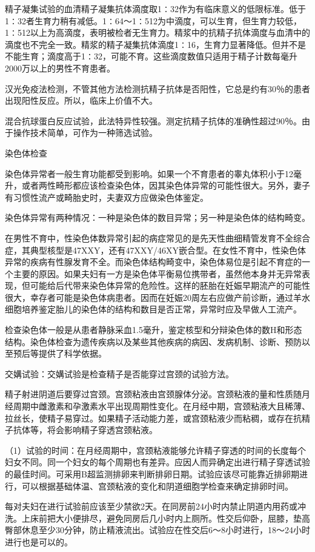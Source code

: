 \documentclass[12pt,UTF8,openany]{ctexbook}
\begin{document}
精子凝集试验的血清精子凝集抗体滴度取1∶32作为有临床意义的低限标准。低于1∶32者生育力稍有减低。1∶64～1∶512为中滴度，可以生育，但生育力较低，1∶512以上为高滴度，表明被检者无生育力。精浆中的抗精子抗体滴度与血清中的滴度也不完全一致。精浆的精子凝集抗体滴度1∶16，生育力显著降低。但并不是不能生育；滴度高于1∶32，可能不育。这些滴度数值只适用于精子计数每毫升2000万以上的男性不育患者。

汉光免疫法检测，不管其他方法检测抗精子抗体是否阳性，它总是约有30％的患者出现阳性反应。所以，临床上价值不大。

混合抗球蛋白反应试验，此法特异性较强。测定抗精子抗体的准确性超过90％。由于操作技术简单，可作为一种筛选试验。

染色体检查

染色体异常者一般生育功能都受到影响。如果一个不育患者的睾丸体积小于12毫升，或者两性畸形都应该检查染色体，因其染色体异常的可能性很大。另外，妻子有习惯性流产或畸胎史时，夫妻双方应做染色体鉴定。

染色体异常有两种情况：一种是染色体的数目异常；另一种是染色体的结构畸变。

在男性不育中，性染色体数异常引起的病症常见的是先天性曲细精管发育不全综合症，其典型核型是47XXY，还有47XXY/46XY嵌合型。在女性不育中，性染色体异常的疾病有性腺发育不全。而染色体结构畸变中，染色体易位是引起不育症的一个主要的原因。如果夫妇有一方是染色体平衡易位携带者，虽然他本身并无异常表现，但可能给后代带来染色体异常的危险性。这样的胚胎在妊娠早期流产的可能性很大，幸存者可能是染色体病患者。因而在妊娠20周左右应做产前诊断，通过羊水细胞培养鉴定胎儿的染色体的结构和数目是否正常，异常时应及早做人工流产。

检查染色体一般是从患者静脉采血1.5毫升，鉴定核型和分辩染色体的数H和形态结构。染色体检查为遗传疾病以及某些其他疾病的病因、发病机制、诊断、预防以至预后等提供了科学依据。

交媾试验：交媾试验是检查精子是否能穿过宫颈的试验方法。

精子射进阴道后要穿过宫颈。宫颈粘液由宫颈腺体分泌。宫颈粘液的量和性质随月经周期中雌激素和孕激素水平出现周期性变化。在月经中期，宫颈粘液大且稀薄、拉丝长，使精子易穿过。如果精子活动能力差，或宫颈粘液少而粘稠，或存在抗精子抗体等，将会影响精子穿透宫颈粘液。

（1）试验的时间：在月经周期中，宫颈粘液能够允许精子穿透的时间的长度每个妇女不同。同一个妇女的每个周期也有差异。应因人而异确定出进行精子穿透试验的最佳时间。可采用B超监测排卵来判断排卵日期。试验应该尽可能靠近排卵期进行，可以根据基础体温、宫颈粘液的变化和阴道细胞学检查来确定排卵时间。

每对夫妇在进行试验前应该至少禁欲2天。在同房前24小时内禁止阴道内用药或冲洗。上床前把大小便排尽，避免同房后几小时内上厕所。性交后仰卧，屈膝，垫高臀部休息至少30分钟，防止精液流出。试验应在性交后6～8小时进行，18～24小时进行也是可以的。
\end{document}
